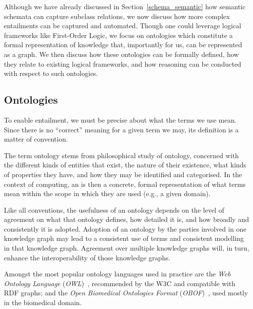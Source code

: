 Although we have already discussed in Section~\ref{schema_semantic} how semantic schemata can capture subclass relations, we now discuss how more complex entailments can be captured and automated. Though one could leverage logical frameworks like First-Order Logic, we focus on ontologies which constitute a formal representation of knowledge that, importantly for us, can be represented as a graph. We then discuss how these ontologies can be formally defined, how they relate to existing logical frameworks, and how reasoning can be conducted with respect to such ontologies.

\subsection{Ontologies}\label{ontologies}
To enable entailment, we must be precise about what the terms we use mean. Since there is no ``correct'' meaning for a given term we may, its definition is a matter of convention.

The term ontology stems from philosophical study of ontology, concerned with the different kinds of entities that exist, the nature of their existence, what kinds of properties they have, and how they may be identified and categorised. In the context of computing, an  is then a concrete, formal representation of what terms mean within the scope in which they are used (e.g., a given domain). 

Like all conventions, the usefulness of an ontology depends on the level of agreement on what that ontology defines, how detailed it is, and how broadly and consistently it is adopted. Adoption of an ontology by the parties involved in one knowledge graph may lead to a consistent use of
terms and consistent modelling in that knowledge graph. Agreement over multiple knowledge graphs will, in turn, enhance the interoperability of those knowledge graphs.

Amongst the most popular ontology languages used in practice are the \textit{Web Ontology Language}
(\textit{OWL})~\cite{Hitzler2014OWLPrimer}, recommended by the W3C and compatible with RDF graphs; and the \textit{Open Biomedical
Ontologies Format} (\textit{OBOF})~\cite{Mungall2012OBOF}, used mostly in the biomedical domain. 

